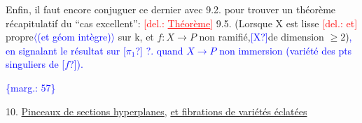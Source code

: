 \documentclass[11pt]{article}
\newcommand{\scanpage}[1]{\par\bigskip\noindent{\small\sffamily[scan #1]}\par}
\newcommand{\mspage}[1]{{\small\sffamily[p.\,#1]}}
\newcommand{\hand}[1]{\textcolor{blue}{#1}}
\newcommand{\inserted}[2][]{\textcolor{blue}{$\langle$#2$\rangle$}}
\newcommand{\margin}[1]{\textcolor{blue}{\{\textsf{marg.:} #1\}}}
\newcommand{\deleted}[1]{\textcolor{red}{[\textsf{del.:} #1]}}
\newcommand{\uline}[1]{\underline{#1}}
\newcommand{\unsure}[1]{[#1?]}
\begin{document}
Enfin, il faut encore conjuguer  ce dernier avec 9.2. pour
trouver un théorème récapitulatif  du ``cas excellent'':
\deleted{\uline{Théorème}} 9.5.   (Lorsque X est lisse \deleted{et} propre\inserted{(et géom intègre)} sur k, et $f:X\to P$ non
ramifié,\hand{\unsure{X}}de dimension $\geqslant 2$)\hand{, en signalant le résultat sur \unsure{$\pi_1$} ?.}
\hand{quand $X\to P$ non immersion (variété des pts singuliers de \unsure{$f$}).}

\margin{57}

\clearpage
\scanpage{25/58}
\mspage{53}

10. \uline{Pinceaux de sections hyperplanes}, \uline{et fibrations de variétés éclatées}
\end{document}
